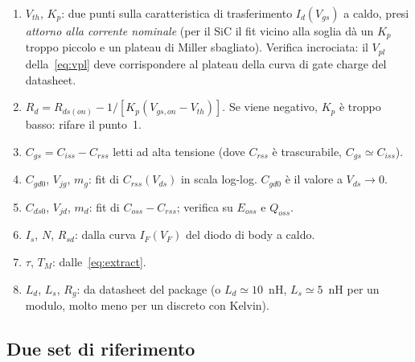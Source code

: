 \documentclass[11pt,a4paper]{article}
\begin{document}
\begin{enumerate}
  \item $V_{th}$, $K_p$: due punti sulla caratteristica di trasferimento
        $I_d(V_{gs})$ a caldo, presi \emph{attorno alla corrente nominale}
        (per il SiC il fit vicino alla soglia dà un $K_p$ troppo piccolo e un
        plateau di Miller sbagliato). Verifica incrociata: il $V_{pl}$
        della~\eqref{eq:vpl} deve corrispondere al plateau della curva di
        gate charge del datasheet.
  \item $R_d=R_{ds(on)}-1/[K_p(V_{gs,on}-V_{th})]$. Se viene negativo,
        $K_p$ è troppo basso: rifare il punto~1.
  \item $C_{gs}=C_{iss}-C_{rss}$ letti ad alta tensione (dove $C_{rss}$ è
        trascurabile, $C_{gs}\simeq C_{iss}$).
  \item $C_{gd0}$, $V_{jg}$, $m_g$: fit di $C_{rss}(V_{ds})$ in scala
        log-log. $C_{gd0}$ è il valore a $V_{ds}\to0$.
  \item $C_{ds0}$, $V_{jd}$, $m_d$: fit di $C_{oss}-C_{rss}$; verifica su
        $E_{oss}$ e $Q_{oss}$.
  \item $I_s$, $N$, $R_{sd}$: dalla curva $I_F(V_F)$ del diodo di body a
        caldo.
  \item $\tau$, $T_M$: dalle~\eqref{eq:extract}.
  \item $L_d$, $L_s$, $R_g$: da datasheet del package (o
        $L_d\simeq10$~nH, $L_s\simeq5$~nH per un modulo, molto meno per un
        discreto con Kelvin).
\end{enumerate}

\subsection{Due set di riferimento}
\end{document}
